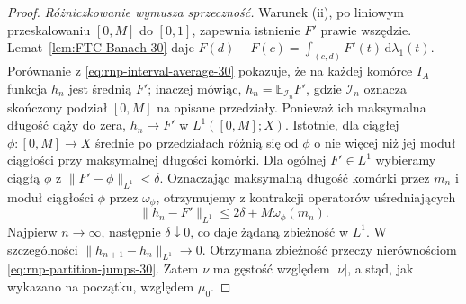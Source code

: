 \begin{proof}
\emph{Różniczkowanie wymusza sprzeczność.}
Warunek (ii), po liniowym przeskalowaniu $[0,M]$
do $[0,1]$, zapewnia istnienie $F'$ prawie wszędzie.
Lemat~\ref{lem:FTC-Banach-30} daje
$F(d)-F(c)=\int_{(c,d)}F'(t)\,\mathrm d\lambda_1(t)$.
Porównanie z \eqref{eq:rnp-interval-average-30}
pokazuje, że na każdej komórce $I_A$ funkcja $h_n$
jest średnią $F'$; inaczej mówiąc,
$h_n=\mathbb E_{\mathcal I_n}F'$,
gdzie $\mathcal I_n$ oznacza skończony podział
$[0,M]$ na opisane przedziały.
Ponieważ ich maksymalna długość dąży do zera,
$h_n\to F'$ w $L^1([0,M];X)$. Istotnie, dla ciągłej
$\phi:[0,M]\to X$ średnie po przedziałach różnią się
od $\phi$ o nie więcej niż jej moduł ciągłości
przy maksymalnej długości komórki. Dla ogólnej $F'\in L^1$ wybieramy ciągłą
$\phi$ z $\|F'-\phi\|_{L^1}<\delta$. Oznaczając
maksymalną długość komórki przez $m_n$ i moduł
ciągłości $\phi$ przez $\omega_\phi$, otrzymujemy
z kontrakcji operatorów uśredniających
\[
 \|h_n-F'\|_{L^1}
 \le 2\delta+M\omega_\phi(m_n).
\]
Najpierw $n\to\infty$, następnie $\delta\downarrow0$,
co daje żądaną zbieżność w $L^1$. W szczególności
$\|h_{n+1}-h_n\|_{L^1}\to0$.
Otrzymana zbieżność przeczy nierównościom
\eqref{eq:rnp-partition-jumps-30}. Zatem $\nu$
ma gęstość względem $|\nu|$, a stąd, jak wykazano
na początku, względem $\mu_0$.
\end{proof}

